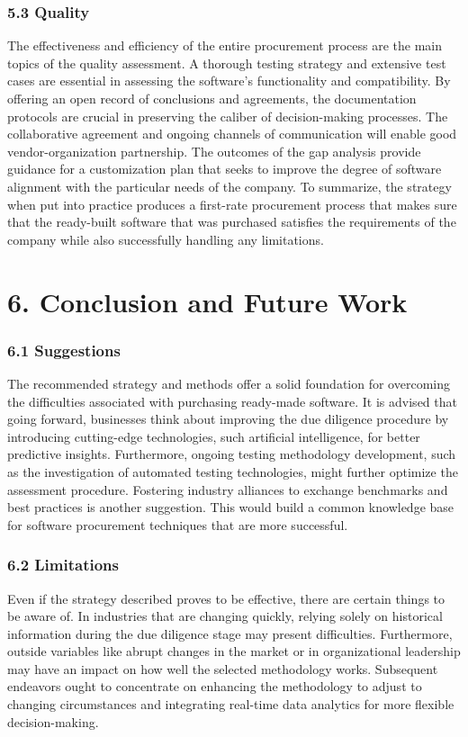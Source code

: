 \documentclass[letterpaper, 11pt]{report}
\begin{document}
{\subsubsection*{5.3 Quality}
\normalsize{ The effectiveness and efficiency of the entire procurement process are the main topics of the quality assessment. A thorough testing strategy and extensive test cases are essential in assessing the software's functionality and compatibility. By offering an open record of conclusions and agreements, the documentation protocols are crucial in preserving the caliber of decision-making processes. The collaborative agreement and ongoing channels of communication will enable good vendor-organization partnership. The outcomes of the gap analysis provide guidance for a customization plan that seeks to improve the degree of software alignment with the particular needs of the company. To summarize, the strategy when put into practice produces a first-rate procurement process that makes sure that the ready-built software that was purchased satisfies the requirements of the company while also successfully handling any limitations.
}

\section*{6. Conclusion and Future Work}
\subsubsection*{6.1 Suggestions}
\normalsize{The recommended strategy and methods offer a solid foundation for overcoming the difficulties associated with purchasing ready-made software. It is advised that going forward, businesses think about improving the due diligence procedure by introducing cutting-edge technologies, such artificial intelligence, for better predictive insights. Furthermore, ongoing testing methodology development, such as the investigation of automated testing technologies, might further optimize the assessment procedure. Fostering industry alliances to exchange benchmarks and best practices is another suggestion. This would build a common knowledge base for software procurement techniques that are more successful.
}

\subsubsection*{6.2 Limitations}
\normalsize{Even if the strategy described proves to be effective, there are certain things to be aware of. In industries that are changing quickly, relying solely on historical information during the due diligence stage may present difficulties. Furthermore, outside variables like abrupt changes in the market or in organizational leadership may have an impact on how well the selected methodology works. Subsequent endeavors ought to concentrate on enhancing the methodology to adjust to changing circumstances and integrating real-time data analytics for more flexible decision-making.
}

}
\end{document}
